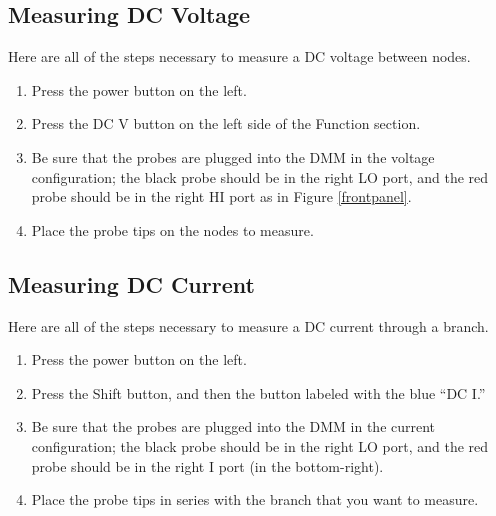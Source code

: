 \documentclass{article}
\begin{document}
\subsection{Measuring DC Voltage}
Here are all of the steps necessary to measure a DC voltage between nodes.
\begin{enumerate}
\item Press the power button on the left.
\item Press the DC V button on the left side of the Function section.
\item Be sure that the probes are plugged into the DMM in the voltage configuration; the black probe should be in the right LO port, and the red probe should be in the right HI port as in Figure \ref{frontpanel}.
\item Place the probe tips on the nodes to measure.
\end{enumerate}

\subsection{Measuring DC Current}
Here are all of the steps necessary to measure a DC current through a branch.
\begin{enumerate}
\item Press the power button on the left.
\item Press the Shift button, and then the button labeled with the blue ``DC I.''
\item Be sure that the probes are plugged into the DMM in the current configuration; the black probe should be in the right LO port, and the red probe should be in the right I port (in the bottom-right).
\item Place the probe tips in series with the branch that you want to measure.
\end{enumerate}
\end{document}
